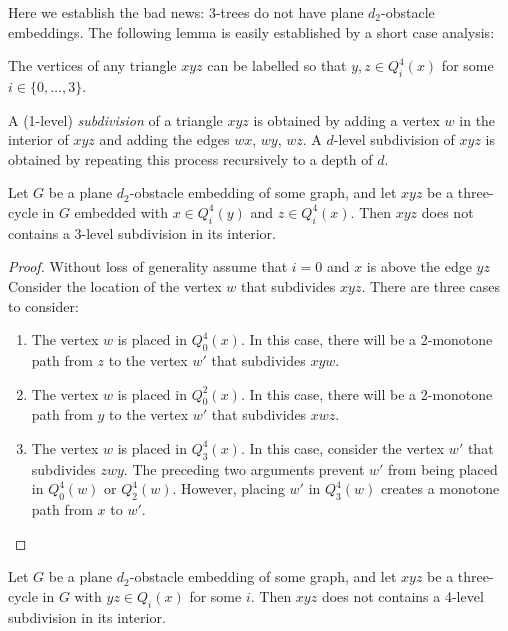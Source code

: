 \documentclass{patmorin}
\begin{document}
Here we establish the bad news: 3-trees do not have plane $d_2$-obstacle
embeddings.  The following lemma is easily established by a short case
analysis:

\begin{lem}
  The vertices of any triangle $xyz$ can be labelled so that $y,z\in Q^4_i(x)$ for some $i\in\{0,\ldots,3\}$.
\end{lem}

A (1-level) \emph{subdivision} of a triangle $xyz$ is obtained by adding a
vertex $w$ in the interior of $xyz$ and adding the edges $wx$, $wy$, $wz$.
A $d$-level subdivision of $xyz$ is obtained by repeating this process
recursively to a depth of $d$.

\begin{lem}
   Let $G$ be a plane $d_2$-obstacle embedding of some graph, and let $xyz$
   be a three-cycle in $G$ embedded with $x\in Q^4_i(y)$ and $z\in Q^4_i(x)$.
   Then $xyz$ does not contains a 3-level subdivision in its interior.
\end{lem}

\begin{proof}
   Without loss of generality assume that $i=0$ and $x$ is above the edge
   $yz$ Consider the location of the vertex $w$ that subdivides $xyz$.
   There are three cases to consider:
   \begin{enumerate}
      \item The vertex $w$ is placed in $Q^4_0(x)$.  In this case,
        there will be a 2-monotone path from $z$ to the vertex $w'$ that
        subdivides $xyw$.
      \item The vertex $w$ is placed in $Q^2_0(x)$.  In this case,
        there will be a 2-monotone path from $y$ to the vertex $w'$ that
        subdivides $xwz$.
      \item The vertex $w$ is placed in $Q^4_3(x)$. In this case,
      consider the vertex $w'$ that subdivides $zwy$.  The preceding
      two arguments prevent $w'$ from being placed in $Q^4_0(w)$
      or $Q^4_2(w)$.  However, placing $w'$ in $Q^4_3(w)$ creates a
      monotone path from $x$ to $w'$.
   \end{enumerate} 
\end{proof}

\begin{lem}
   Let $G$ be a plane $d_2$-obstacle embedding of some graph, and let
   $xyz$ be a three-cycle in $G$ with $yz\in Q_i(x)$ for some $i$.
   Then $xyz$ does not contains a 4-level subdivision in its interior.
\end{lem}
\end{document}
